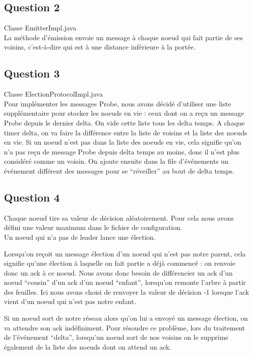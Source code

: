 \documentclass[paper=a4, fontsize=11pt]{article} %
\begin{document}
\subsection{Question 2}
Classe EmitterImpl.java\\
La méthode d'émission envoie un message à chaque noeud qui fait partie de ses voisins, c'est-à-dire qui est à une distance inférieure à la portée.

\subsection{Question 3}
Classe ElectionProtocolImpl.java \\
Pour implémenter les messages Probe, nous avons décidé d'utiliser une liste supplémentaire pour stocker les noeuds en vie : ceux dont on a reçu un message Probe depuis le dernier delta. On vide cette liste tous les delta temps.
A chaque timer delta, on va faire la différence entre la liste de voisins et la liste des noeuds en vie. Si un noeud n'est pas dans la liste des noeuds en vie, cela signifie qu'on n'a pas reçu de message Probe depuis delta temps au moins, donc il n'est plus considéré comme un voisin.
On ajoute ensuite dans la file d'événements un événement différent des messages pour se \enquote{réveiller} au bout de delta temps.


\subsection{Question 4}
Chaque noeud tire sa valeur de décision aléatoirement. Pour cela nous avons défini une valeur maximum dans le fichier de configuration.\\
Un noeud qui n'a pas de leader lance une élection.

Lorsqu'on reçoit un message élection d'un noeud qui n'est pas notre parent, cela signifie qu'une élection à laquelle on fait partie a déjà commencé : on renvoie donc un ack à ce noeud.
Nous avons donc besoin de différencier un ack d'un noeud \enquote{cousin} d'un ack d'un noeud \enquote{enfant}, lorsqu'on remonte l'arbre à partir des feuilles.
Ici nous avons choisi de renvoyer la valeur de décision -1 lorsque l'ack vient d'un noeud qui n'est pas notre enfant. 

Si un noeud sort de notre réseau alors qu'on lui a envoyé un message élection, on va attendre son ack indéfiniment. 
Pour résoudre ce problème, lors du traitement de l'événement \enquote{delta}, lorsqu'un noeud sort de nos voisins on le supprime également de la liste des noeuds dont on attend un ack.
\end{document}
